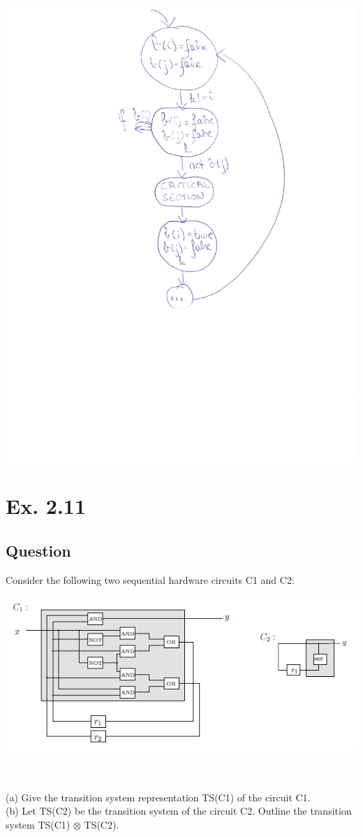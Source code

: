 \documentclass[12pt]{article}
\begin{document}
\begin{itemize}
\begin{centering}
		\includegraphics*[scale=0.6]{210b.jpg}
	\end{centering}
\end{itemize}

\newpage
\section*{Ex. 2.11}
\subsection*{Question}
Consider the following two sequential hardware circuits C1 and C2:\\
\begin{centering}
	\includegraphics*[scale=0.8]{ex211.png}
\end{centering}\\
\\
(a) Give the transition system representation TS(C1) of the circuit C1.\\
(b) Let TS(C2) be the transition system of the circuit C2. Outline the transition system TS(C1) $\otimes$
TS(C2).
\end{document}
